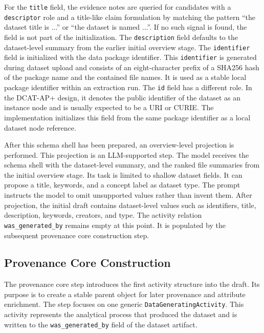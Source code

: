 For the \texttt{title} field, the evidence notes are queried for candidates with a \texttt{descriptor} role and a title-like claim formulation by matching the pattern \enquote{the dataset title is ...} or \enquote{the dataset is named ...}.
If no such signal is found, the field is not part of the initialization.
The \texttt{description} field defaults to the dataset-level summary from the earlier initial overview stage.
The \texttt{identifier} field is initialized with the data package identifier.
This \texttt{identifier} is generated during dataset upload and consists of an eight-character prefix of a \ac{SHA256} hash of the package name and the contained file names.
It is used as a stable local package identifier within an extraction run.
The \texttt{id} field has a different role.
In the \ac{DCAT-AP+} design, it denotes the public identifier of the dataset as an instance node and is usually expected to be a \ac{URI} or \ac{CURIE}.
The implementation initializes this field from the same package identifier as a local dataset node reference.

After this schema shell has been prepared, an overview-level projection is performed.
This projection is an \ac{LLM}-supported step.
The model receives the schema shell with the dataset-level summary, and the ranked file summaries from the initial overview stage.
Its task is limited to shallow dataset fields.
It can propose a title, keywords, and a concept label as dataset type.
The prompt instructs the model to omit unsupported values rather than invent them.
After projection, the initial draft contains dataset-level values such as identifiers, title, description, keywords, creators, and type.
The activity relation \texttt{was\_generated\_by} remains empty at this point.
It is populated by the subsequent provenance core construction step.

\subsection{Provenance Core Construction}
\label{sec:provenance_core_construction}

The provenance core step introduces the first activity structure into the draft.
Its purpose is to create a stable parent object for later provenance and attribute enrichment.
The step focuses on one generic \texttt{DataGeneratingActivity}.
This activity represents the analytical process that produced the dataset and is written to the \texttt{was\_generated\_by} field of the dataset artifact.

